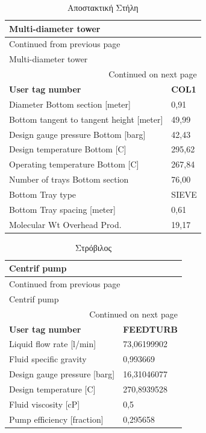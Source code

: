 \documentclass[11pt]{article}
\begin{document}
\begin{longtable}{ll}
\caption{Αποστακτική Στήλη}
\\
Multi-diameter tower & \\
\hline
\endfirsthead
\multicolumn{2}{l}{Continued from previous page} \\
\hline

Multi-diameter tower &  \\

\hline
\endhead
\hline\multicolumn{2}{r}{Continued on next page} \\
\endfoot
\endlastfoot
\hline
\textbf{User tag number} & \textbf{COL1}\\
Diameter Bottom section [meter] & 0,91\\
Bottom tangent to tangent height [meter] & 49,99\\
Design gauge pressure Bottom [barg] & 42,43\\
Design temperature Bottom [C] & 295,62\\
Operating temperature Bottom [C] & 267,84\\
Number of trays Bottom section & 76,00\\
Bottom Tray type & SIEVE\\
Bottom Tray spacing [meter] & 0,61\\
Molecular Wt Overhead Prod. & 19,17\\
\end{longtable}

\begin{longtable}{ll}
\caption{Στρόβιλος}
\\
Centrif pump & \\
\hline
\endfirsthead
\multicolumn{2}{l}{Continued from previous page} \\
\hline

Centrif pump &  \\

\hline
\endhead
\hline\multicolumn{2}{r}{Continued on next page} \\
\endfoot
\endlastfoot
\hline
\textbf{User tag number} & \textbf{FEEDTURB}\\
Liquid flow rate [l/min] & 73,06199902\\
Fluid specific gravity & 0,993669\\
Design gauge pressure [barg] & 16,31046077\\
Design temperature [C] & 270,8939528\\
Fluid viscosity [cP] & 0,5\\
Pump efficiency [fraction] & 0,295658\\
\end{longtable}
\end{document}
